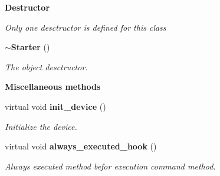 \begin{Indent}{\bf Destructor}\par
{\em Only one desctructor is defined for this class}\begin{CompactItemize}
\item 
{\bf $\sim$Starter} ()
\begin{CompactList}\small\item\em The object desctructor.\item\end{CompactList}\end{CompactItemize}
\end{Indent}
\begin{Indent}{\bf Miscellaneous methods}\par
\begin{CompactItemize}
\item 
virtual void {\bf init\_\-device} ()
\begin{CompactList}\small\item\em Initialize the device.\item\end{CompactList}\item 
virtual void {\bf always\_\-executed\_\-hook} ()
\begin{CompactList}\small\item\em Always executed method befor execution command method.\item\end{CompactList}\end{CompactItemize}
\end{Indent}

